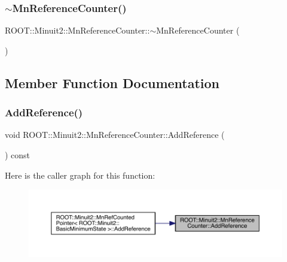 \subsubsection{\texorpdfstring{$\sim$MnReferenceCounter()}{~MnReferenceCounter()}\hspace{0.1cm}{\footnotesize\ttfamily [2/2]}}
{\footnotesize\ttfamily R\+O\+O\+T\+::\+Minuit2\+::\+Mn\+Reference\+Counter\+::$\sim$\+Mn\+Reference\+Counter (\begin{DoxyParamCaption}{ }\end{DoxyParamCaption})\hspace{0.3cm}{\ttfamily [inline]}}



\subsection{Member Function Documentation}
\mbox{\label{classROOT_1_1Minuit2_1_1MnReferenceCounter_afab040d933d93fd7f86b3c14a8d1910d}} 
\subsubsection{\texorpdfstring{AddReference()}{AddReference()}\hspace{0.1cm}{\footnotesize\ttfamily [1/2]}}
{\footnotesize\ttfamily void R\+O\+O\+T\+::\+Minuit2\+::\+Mn\+Reference\+Counter\+::\+Add\+Reference (\begin{DoxyParamCaption}{ }\end{DoxyParamCaption}) const\hspace{0.3cm}{\ttfamily [inline]}}

Here is the caller graph for this function\+:\nopagebreak
\begin{figure}[H]
\begin{center}
\leavevmode
\includegraphics[width=350pt]{dc/da2/classROOT_1_1Minuit2_1_1MnReferenceCounter_afab040d933d93fd7f86b3c14a8d1910d_icgraph}
\end{center}
\end{figure}
\mbox{\label{classROOT_1_1Minuit2_1_1MnReferenceCounter_afab040d933d93fd7f86b3c14a8d1910d}} 
